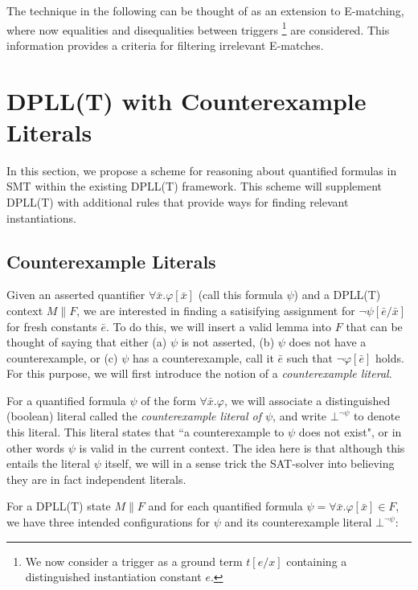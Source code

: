 \documentclass{llncs}
\begin{document}
The technique in the following can be thought of as an extension to E-matching, where now equalities and disequalities between triggers \footnote{We now consider a trigger as a ground term $t[e/x]$ containing a distinguished instantiation constant $e$. }
 are considered.
This information provides a criteria for filtering irrelevant E-matches.

\section{DPLL(T) with Counterexample Literals}
\label{dpll-ce-lit}

In this section, we propose a scheme for reasoning about quantified formulas in SMT within the existing DPLL(T) framework.
This scheme will supplement DPLL(T) with additional rules that provide ways for finding relevant instantiations.

\subsection{Counterexample Literals}

Given an asserted quantifier $\forall \bar{x}. \varphi[\bar{x}]$ (call this formula $\psi$) and a DPLL(T) context $M \parallel F$, we are interested in finding a satisifying assignment for $ \neg \psi[\bar{e}/\bar{x}]$ for fresh constants $\bar{e}$.
To do this, we will insert a valid lemma into $F$ that can be thought of saying that either (a) $\psi$ is not asserted, (b) $\psi$ does not have a counterexample, or (c) $\psi$ has a counterexample, call it $\bar{e}$ such that $\neg \varphi[\bar{e}]$ holds.
For this purpose, we will first introduce the notion of a \emph{counterexample literal}.

For a quantified formula $\psi$ of the form $\forall \bar{ x }. \varphi$, we will associate a distinguished (boolean) literal called the \emph{counterexample literal of $\psi$}, and write $\bot^{\neg \psi}$ to denote this literal.
This literal states that ``a counterexample to $\psi$ does not exist", or in other words $\psi$ is valid in the current context.
The idea here is that although this entails the literal $\psi$ itself, we will in a sense trick the SAT-solver into believing they are in fact independent literals.

For a DPLL(T) state $M \parallel F$ and for each quantified formula $\psi = \forall \bar{ x }. \varphi[ \bar{ x } ] \in F$, we have three intended configurations for $\psi$ and its counterexample literal $\bot^{\neg \psi}$: \\
\end{document}
